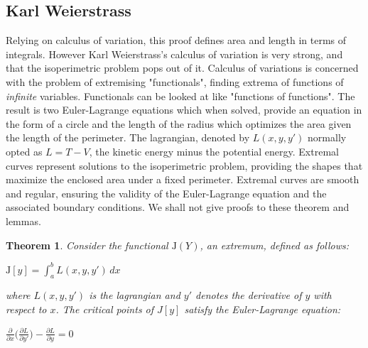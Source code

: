 \documentclass[a4paper]{book}
\newtheorem{theorem}{Theorem}%
\numberwithin{theorem}{section}%
\begin{document}
\subsection{Karl Weierstrass}
Relying on calculus of variation, this proof defines area and length in terms of integrals. However Karl Weierstrass's calculus of variation is very strong, and that the isoperimetric problem pops out of it. Calculus of variations is concerned with the problem of extremising "functionals", finding extrema of functions of \textit{infinite} variables. Functionals can be looked at like "functions of functions". The result is two Euler-Lagrange equations which when solved, provide an equation in the form of a circle and the length of the radius which optimizes the area given the length of the perimeter. The lagrangian, denoted by $L(x,y,y')$ normally opted as $L=T-V$, the kinetic energy minus the potential energy. Extremal curves represent solutions to the isoperimetric problem, providing the shapes that maximize the enclosed area under a fixed perimeter. Extremal curves are smooth and regular, ensuring the validity of the Euler-Lagrange equation and the associated boundary conditions. We shall not give proofs to these theorem and lemmas.
\begin{theorem}
	Consider the functional $\mathrm{J}(Y)$, an extremum, defined as follows:
	\begin{center}
		$\displaystyle \mathrm{J}[y]=\int_{a}^{b}L(x,y,y')\,dx$
	\end{center}
	where $L(x,y,y')$ is the lagrangian and $y'$ denotes the derivative of $y$ with respect to $x$. The critical points of $J[y]$ satisfy the Euler-Lagrange equation:
	\begin{center}
		$\displaystyle \frac{\partial}{\partial x}\Big(\frac{\partial L}{\partial y'}\Big)-\frac{\partial L}{\partial y}=0$
	\end{center}
\end{theorem}
\end{document}
